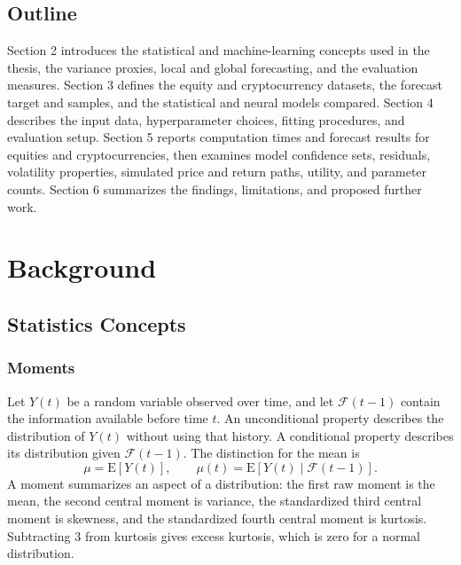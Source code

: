 \documentclass[12pt,a4paper]{article}
\numberwithin{equation}{section}
\numberwithin{table}{section}
\numberwithin{figure}{section}
\begin{document}
\subsection{Outline}
Section 2 introduces the statistical and machine-learning concepts used in the thesis, the variance proxies, local and global forecasting, and the evaluation measures. Section 3 defines the equity and cryptocurrency datasets, the forecast target and samples, and the statistical and neural models compared. Section 4 describes the input data, hyperparameter choices, fitting procedures, and evaluation setup. Section 5 reports computation times and forecast results for equities and cryptocurrencies, then examines model confidence sets, residuals, volatility properties, simulated price and return paths, utility, and parameter counts. Section 6 summarizes the findings, limitations, and proposed further work.

\section{Background}
\subsection{Statistics Concepts}
\subsubsection{Moments}
Let $Y(t)$ be a random variable observed over time, and let $\mathcal{F}(t-1)$ contain the information available before time $t$. An unconditional property describes the distribution of $Y(t)$ without using that history. A conditional property describes its distribution given $\mathcal{F}(t-1)$. The distinction for the mean is
\begin{equation}\label{eq:conditional-mean}
\mu=\mathrm{E}[Y(t)],\qquad \mu(t)=\mathrm{E}[Y(t)\mid\mathcal{F}(t-1)].
\end{equation}
A moment summarizes an aspect of a distribution: the first raw moment is the mean, the second central moment is variance, the standardized third central moment is skewness, and the standardized fourth central moment is kurtosis. Subtracting 3 from kurtosis gives excess kurtosis, which is zero for a normal distribution.
\end{document}
